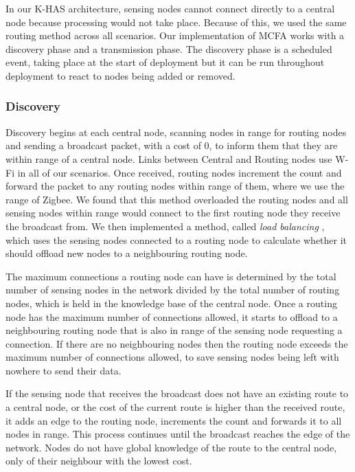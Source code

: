 In our K-HAS architecture, sensing nodes cannot connect directly to a central node because processing would not take place. Because of this, we used the same routing method across all scenarios. Our implementation of MCFA works with a discovery phase and a transmission phase. The discovery phase is a scheduled event, taking place at the start of deployment but it can be run throughout deployment to react to nodes being added or removed. 

\subsubsection{Discovery}\label{sim:disc}
	Discovery begins at each central node, scanning nodes in range for routing nodes and sending a broadcast packet, with a cost of 0, to inform them that they are within range of a central node. Links between Central and Routing nodes use W-Fi in all of our scenarios. Once received, routing nodes increment the count and forward the packet to any routing nodes within range of them, where we use the range of Zigbee. We found that this method overloaded the routing nodes and all sensing nodes within range would connect to the first routing node they receive the broadcast from. We then implemented a method, called \textit{load balancing} \cite{Gupta2003}, which uses the sensing nodes connected to a routing node to calculate whether it should offload new nodes to a neighbouring routing node.
	
	The maximum connections a routing node can have is determined by the total number of sensing nodes in the network divided by the total number of routing nodes, which is held in the knowledge base of the central node. Once a routing node has the maximum number of connections allowed, it starts to offload to a neighbouring routing node that is also in range of the sensing node requesting a connection. If there are no neighbouring nodes then the routing node exceeds the maximum number of connections allowed, to save sensing nodes being left with nowhere to send their data.
	
	If the sensing node that receives the broadcast does not have an existing route to a central node, or the cost of the current route is higher than the received route, it adds an edge to the routing node, increments the count and forwards it to all nodes in range. This process continues until the broadcast reaches the edge of the network. Nodes do not have global knowledge of the route to the central node, only of their neighbour with the lowest cost.
	
